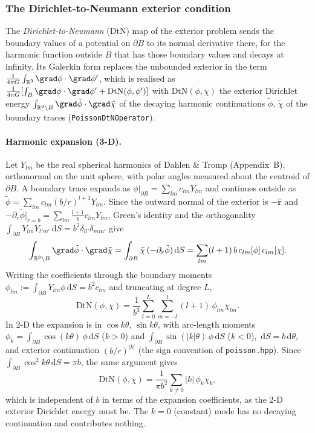\documentclass[11pt]{article}
\numberwithin{equation}{section}
\theoremstyle{remark}
\newcommand{\R}{\mathbb{R}}
\newcommand{\dS}{\,\mathrm{d}S}
\newcommand{\DtN}{\mathrm{DtN}}
\newcommand{\code}[1]{\texttt{#1}}
\begin{document}
\subsubsection{The Dirichlet-to-Neumann exterior condition}
\label{sec:dtn}

The \emph{Dirichlet-to-Neumann} (DtN) map of the exterior problem sends
the boundary values of a potential on $\partial B$ to its normal derivative
there, for the harmonic function outside $B$ that has those boundary values
and decays at infinity. Its Galerkin form replaces the unbounded exterior
in the term $\frac{1}{4\pi G}\int_{\R^3}\grad\phi\cdot\grad\phi'$, which
is realised as $\frac{1}{4\pi G}[\int_B\grad\phi\cdot\grad\phi' +
\DtN(\phi,\phi')]$ with $\DtN(\phi,\chi)$ the exterior Dirichlet energy
$\int_{\R^3\setminus B}\grad\tilde\phi\cdot\grad\tilde\chi$ of the decaying
harmonic continuations $\tilde\phi$, $\tilde\chi$ of the boundary traces
(\code{PoissonDtNOperator}).

\paragraph{Harmonic expansion (3-D).} Let $Y_{lm}$ be the real spherical
harmonics of Dahlen \& Tromp \cite{DahlenTromp1998} (Appendix~B),
orthonormal on the unit sphere, with polar angles measured about the
centroid of $\partial B$. A boundary trace expands as $\phi|_{\partial B}
= \sum_{lm}c_{lm}Y_{lm}$ and continues outside as $\tilde\phi =
\sum_{lm}c_{lm}(b/r)^{l+1}Y_{lm}$. Since the outward normal of the exterior
is $-\hat{\mathbf{r}}$ and $-\partial_r\tilde\phi|_{r=b} =
\sum_{lm}\frac{l+1}{b}c_{lm}Y_{lm}$, Green's identity and the orthogonality
$\int_{\partial B}Y_{lm}Y_{l'm'}\dS = b^2\delta_{ll'}\delta_{mm'}$ give
\[
  \int_{\R^3\setminus B}\grad\tilde\phi\cdot\grad\tilde\chi
  = \int_{\partial B}\tilde\chi\,(-\partial_r\tilde\phi)\dS
  = \sum_{lm}(l+1)\,b\,c_{lm}[\phi]\,c_{lm}[\chi].
\]
Writing the coefficients through the boundary moments
$\phi_{lm} := \int_{\partial B}Y_{lm}\phi\dS = b^2c_{lm}$ and truncating at
degree $L$,
\begin{equation}
  \DtN(\phi,\chi) = \frac{1}{b^3}\sum_{l=0}^{L}\sum_{m=-l}^{l}(l+1)\,
     \phi_{lm}\chi_{lm}.
  \label{eq:dtn3}
\end{equation}
In 2-D the expansion is in $\cos k\theta$, $\sin k\theta$, with
arc-length moments $\phi_k = \int_{\partial B}\cos(k\theta)\,\phi\dS$
($k>0$) and $\int_{\partial B}\sin(|k|\theta)\,\phi\dS$ ($k<0$), $\dS =
b\,\mathrm{d}\theta$, and exterior continuation $(b/r)^{|k|}$ (the sign
convention of \code{poisson.hpp}). Since
$\int_{\partial B}\cos^2k\theta\dS = \pi b$, the same argument gives
\begin{equation}
  \DtN(\phi,\chi) = \frac{1}{\pi b^2}\sum_{k\neq0}|k|\,\phi_k\chi_k ,
\end{equation}
which is independent of $b$ in terms of the expansion coefficients, as the
2-D exterior Dirichlet energy must be. The $k = 0$ (constant) mode has no
decaying continuation and contributes nothing.
\end{document}
